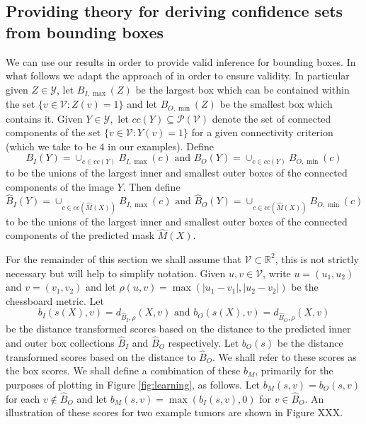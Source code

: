 \subsection{Providing theory for deriving confidence sets from bounding boxes}\label{AA:BBtheory}
We can use our results in order to provide valid inference for bounding boxes.  In what follows we adapt the approach of \cite{Andeol2023} in order to ensure validity. In particular given $Z \in \mathcal{Y}$, let $B_{I, \max}(Z)$ be the largest box which can be contained within the set $\lbrace v\in \mathcal{V}: Z(v) = 1 \rbrace$ and let $ B_{O, \min}(Z)$ be the smallest box which contains it. Given $Y \in \mathcal{Y}, $ let $cc(Y) \subseteq \mathcal{P}(\mathcal{V})$ denote the set of connected components of the set $\lbrace v\in \mathcal{V}: Y(v) = 1 \rbrace$ for a given connectivity criterion (which we take to be $4$ in our examples). Define 
$$B_I(Y) = \cup_{c \in cc(Y)} B_{I, \max}(c) \text{ and } B_O(Y) = \cup_{c \in cc(Y)} B_{O, \min}(c)$$
to be the unions of the largest inner and smallest outer boxes of the connected components of the image $Y$. Then define
$$\hat{B}_I(Y) = \cup_{c \in cc(\hat{M}(X)) } B_{I, \max}(c) \text{ and } \hat{B}_O(Y) = \cup_{c \in cc(\hat{M}(X))} B_{O, \min}(c)$$
to be the unions of the largest inner and smallest outer boxes of the connected components of the predicted mask $\hat{M}(X).$ 

For the remainder of this section we shall assume that $\mathcal{V} \subset \mathbb{R}^2$, this is not strictly necessary but will help to simplify notation. Given $u,v \in \mathcal{V}$, write $u = (u_1, u_2)$ and $v = (v_1, v_2)$ and let $\rho(u,v) = \max \left( |u_1 - v_1|, |u_2 - v_2| \right)$ be the chessboard metric. Let 
\begin{equation*}
	b_I(s(X), v) = d_{\hat{B}_I, \rho}(X, v) \text{ and } b_O(s(X), v) = d_{\hat{B}_O, \rho}(X, v) 
\end{equation*}
be the distance transformed scores based on the distance to the predicted inner and outer box collections $\hat{B}_I$ and $\hat{B}_O$ respectively. Let $b_O(s)$ be the distance transformed scores based on the distance to $\hat{B}_O$. We shall refer to these scores as the box scores. We shall define a combination of these $b_M$, primarily for the purposes of plotting in Figure \ref{fig:learning}, as follows. Let $b_M(s, v) = b_O(s,v)$ for each $v \not\in \hat{B}_O$ and let $b_M(s, v) = \max(b_I(s,v), 0) $ for $v \in \hat{B}_O$. An illustration of these scores for two example tumors are shown in Figure XXX.

